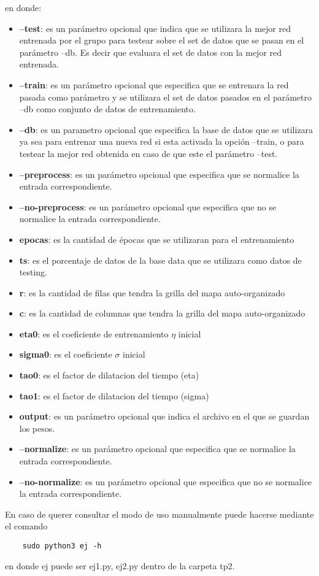 en donde:
\begin{itemize}
  \item \textbf{--test}: es un parámetro opcional que indica que se utilizara la mejor red entrenada por el grupo para testear sobre el set de datos que se pasan en el parámetro
  --db. Es decir que evaluara el set de datos con la mejor red entrenada.
  \item \textbf{--train}: es un parámetro opcional que especifica que se entrenara la red pasada como parámetro y se utilizara el set de datos pasados en el parámetro --db
  como conjunto de datos de entrenamiento.
  \item \textbf{--db}: es un parametro opcional que especifica la base de datos que se utilizara ya sea para entrenar una nueva red si esta activada la opción --train, o
  para testear la mejor red obtenida en caso de que este el parámetro --test.
  \item \textbf{--preprocess}: es un parámetro opcional que especifica que se normalice la entrada correspondiente.
  \item \textbf{--no-preprocess}: es un parámetro opcional que especifica que no se normalice la entrada correspondiente.
  \item \textbf{epocas}: es la cantidad de épocas que se utilizaran para el entrenamiento
  \item \textbf{ts}: es el porcentaje de datos de la base data que se utilizara como datos de testing.
  \item \textbf{r}: es la cantidad de filas que tendra la grilla del mapa auto-organizado
  \item \textbf{c}: es la cantidad de columnas que tendra la grilla del mapa auto-organizado
  \item \textbf{eta0}: es el coeficiente de entrenamiento $\eta$ inicial
  \item \textbf{sigma0}: es el coeficiente $\sigma$ inicial
  \item \textbf{tao0}: es el factor de dilatacion del tiempo (eta)
  \item \textbf{tao1}: es el factor de dilatacion del tiempo (sigma)
  \item \textbf{output}: es un parámetro opcional que indica el archivo en el que se guardan los pesos.
  \item \textbf{--normalize}: es un parámetro opcional que especifica que se normalice la entrada correspondiente.
  \item \textbf{--no-normalize}: es un parámetro opcional que especifica que no se normalice la entrada correspondiente.

\end{itemize}

En caso de querer consultar el modo de uso manualmente puede hacerse mediante el comando
\begin{verbatim}
    sudo python3 ej -h
\end{verbatim}
en donde ej puede ser {ej1.py, ej2.py} dentro de la carpeta tp2.

\newpage
